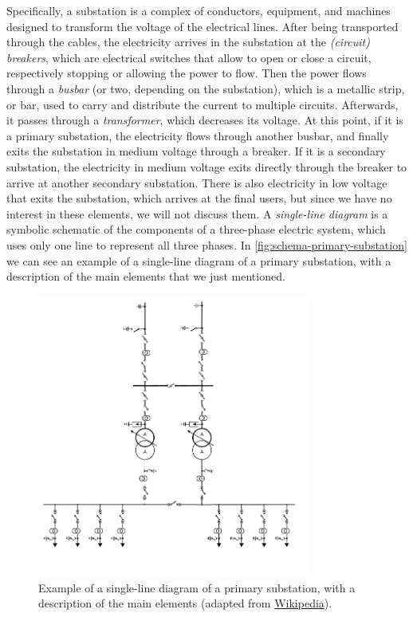 Specifically, a substation is a complex of conductors, equipment, and machines designed to transform the voltage of the electrical lines. After being transported through the cables, the electricity arrives in the substation at the \emph{(circuit) breakers}, which are electrical switches that allow to open or close a circuit, respectively stopping or allowing the power to flow. Then the power flows through a \emph{busbar} (or two, depending on the substation), which is a metallic strip, or bar, used to carry and distribute the current to multiple circuits. Afterwards, it passes through a \emph{transformer}, which decreases its voltage. At this point, if it is a primary substation, the electricity flows through another busbar, and finally exits the substation in medium voltage through a breaker. If it is a secondary substation, the electricity in medium voltage exits directly through the breaker to arrive at another secondary substation. There is also electricity in low voltage that exits the substation, which arrives at the final users, but since we have no interest in these elements, we will not discuss them. A \emph{single-line diagram} is a symbolic schematic of the components of a three-phase electric system, which uses only one line to represent all three phases. In \autoref{fig:schema-primary-substation} we can see an example of a single-line diagram of a primary substation, with a description of the main elements that we just mentioned.

\begin{figure}[t]
    \centering
    \includegraphics[width=0.8\textwidth]{chapters/figures/Schema_Unifilare_Cabina_Primaria.png}
    \caption{Example of a single-line diagram of a primary substation, with a description of the main elements (adapted from \href{https://it.wikipedia.org/wiki/Cabina_primaria}{Wikipedia}).}
    \label{fig:schema-primary-substation}
\end{figure}

